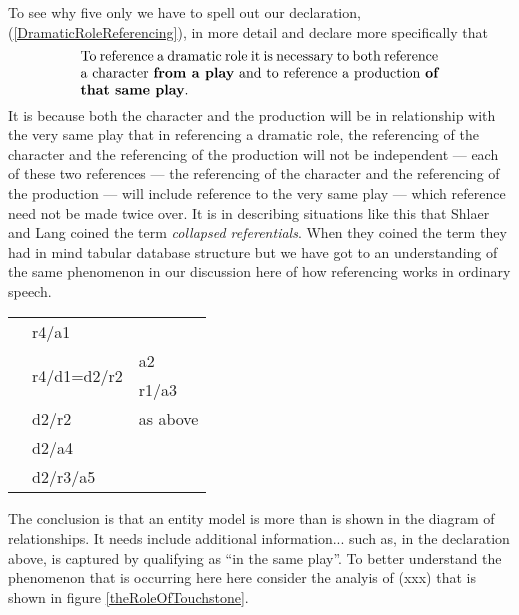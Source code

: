 To see why five only we have to spell out our declaration, (\ref{DramaticRoleReferencing}), in more detail
and declare more specifically that
\begin{equation}
\label{DramaticRoleReferencingRevised}
\text{\parbox{9cm}{To reference a dramatic role it is necessary 
to both reference a character \textbf{from a play} and to reference a production \textbf{of that same play}.}}
\end{equation}
It is because both the character and the production will be in relationship with the very same play
that in referencing a dramatic role, the referencing of the character and the referencing of
the production will not be independent
--- each of these two references --- the referencing of the character and the referencing of the production ---
 will include reference to the very same play --- which reference need not be made twice over. 
It is in describing situations like this that Shlaer and Lang coined the term \textit{collapsed referentials}. 
 When they coined the term they had in mind tabular database structure 
 but we have got to an understanding of the same phenomenon in our discussion here 
 of how referencing works in ordinary speech. 
\mynote
\begin{tabular}{l l l}
& r4/a1 &    \\
& \multirow[t]{2}{1cm}{r4/d1=d2/r2} & a2  \\
&                                 & r1/a3 \\
& d2/r2    & as above\\
& d2/a4 &            \\
& d2/r3/a5 &      
\end{tabular}
\mynote
The conclusion is that an entity model is more than is shown in the diagram of relationships. It needs include additional information... such as, in the declaration above,
 is captured by qualifying as ``in the same play''. 
 \mynote
To better understand the phenomenon that is occurring here here consider the analyis 
of (xxx) that is shown in figure \ref{theRoleOfTouchstone}.
